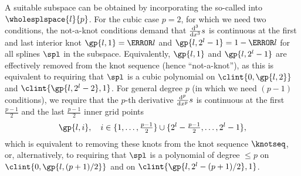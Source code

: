 A suitable subspace can be obtained by incorporating the
so-called  into $\wholesplspace{l}{p}$.
For the cubic case $p = 2$,
for which we need two conditions,
the not-a-knot conditions demand that
$\frac{\mathop{}\!\mathrm{d}^3}{\mathop{}\!\mathrm{d}{}x^3} s$ is continuous at the first and last
interior knot $\gp{l,1} = \ms{l}$ and $\gp{l,2^l-1} = 1 - \ms{l}$
for all splines $\spl$ in the subspace.
Equivalently, $\gp{l,1}$ and $\gp{l,2^l-1}$ are effectively removed from the
knot sequence (hence ``not-a-knot''),
as this is equivalent to requiring that
$\spl$ is a cubic polynomial on $\clint{0, \gp{l,2}}$ and
$\clint{\gp{l,2^l-2}, 1}$.
For general degree $p$ (in which we need $(p - 1)$ conditions),
we require that the $p$-th derivative $\frac{\mathop{}\!\mathrm{d}^p}{\mathop{}\!\mathrm{d}{}x^p} s$
is continuous at the first $\tfrac{p-1}{2}$ and the last $\tfrac{p-1}{2}$
inner grid points
\begin{equation}
  \label{eq:removedNAKKnots}
  \gp{l,i},\quad
  i \in \{1, \dotsc, \tfrac{p-1}{2}\} \cup
  \{2^l - \tfrac{p-1}{2}, \dotsc, 2^l - 1\},
\end{equation}
which is equivalent to removing these knots from the knot sequence $\knotseq$,
or, alternatively, to requiring that $\spl$ is a polynomial
of degree $\le p$ on $\clint{0, \gp{l,(p+1)/2}}$ and on
$\clint{\gp{l,2^l-(p+1)/2}, 1}$.

